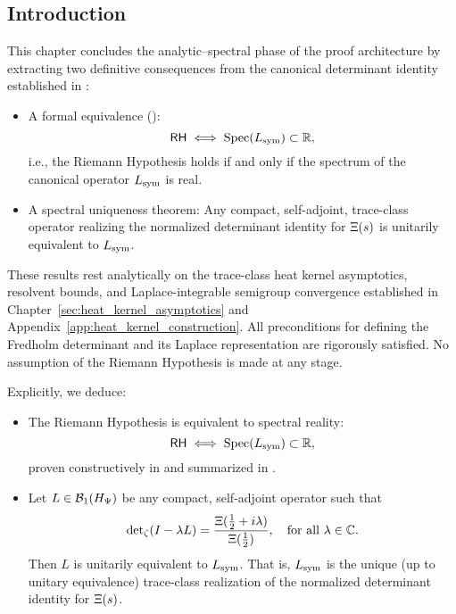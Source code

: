 \subsection*{Introduction}
\label{sec:intro_spectral_implications}

This chapter concludes the analytic–spectral phase of the proof architecture by extracting two definitive consequences from the canonical determinant identity established in :

\begin{itemize}
  \item A formal equivalence ():
  \[
  \mathsf{RH} \iff \operatorname{Spec}(L_{\mathrm{sym}}) \subset \mathbb{R},
  \]
  i.e., the Riemann Hypothesis holds if and only if the spectrum of the canonical operator \( L_{\mathrm{sym}} \) is real.

  \item A spectral uniqueness theorem: Any compact, self-adjoint, trace-class operator realizing the normalized determinant identity for \( \Xi(s) \) is unitarily equivalent to \( L_{\mathrm{sym}} \).
\end{itemize}

These results rest analytically on the trace-class heat kernel asymptotics, resolvent bounds, and Laplace-integrable semigroup convergence established in Chapter~\ref{sec:heat_kernel_asymptotics} and Appendix~\ref{app:heat_kernel_construction}. All preconditions for defining the Fredholm determinant and its Laplace representation are rigorously satisfied. No assumption of the Riemann Hypothesis is made at any stage.

\medskip

Explicitly, we deduce:

\begin{itemize}
  \item The Riemann Hypothesis is equivalent to spectral reality:
  \[
  \mathsf{RH} \iff \operatorname{Spec}(L_{\mathrm{sym}}) \subset \mathbb{R},
  \]
  proven constructively in  and summarized in .

  \item Let \( L \in \mathcal{B}_1(H_{\Psi}) \) be any compact, self-adjoint operator such that
  \[
  \det\nolimits_{\zeta}(I - \lambda L) = \frac{\Xi(\tfrac{1}{2} + i\lambda)}{\Xi(\tfrac{1}{2})}, \quad \text{for all } \lambda \in \mathbb{C}.
  \]
  Then \( L \) is unitarily equivalent to \( L_{\mathrm{sym}} \). That is, \( L_{\mathrm{sym}} \) is the unique (up to unitary equivalence) trace-class realization of the normalized determinant identity for \( \Xi(s) \).
\end{itemize}

